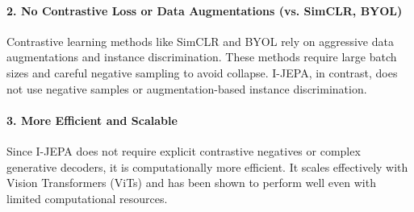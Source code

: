 \documentclass{article}
\begin{document}
\paragraph{2. No Contrastive Loss or Data Augmentations (vs. SimCLR, BYOL)} Contrastive learning methods like SimCLR \citep{chen2020simple} and BYOL \citep{grill2020bootstrap} rely on aggressive data augmentations and instance discrimination. These methods require large batch sizes and careful negative sampling to avoid collapse. I-JEPA, in contrast, does not use negative samples or augmentation-based instance discrimination. 

\paragraph{3. More Efficient and Scalable} Since I-JEPA does not require explicit contrastive negatives or complex generative decoders, it is computationally more efficient. It scales effectively with Vision Transformers (ViTs) and has been shown to perform well even with limited computational resources. 



\end{document}
